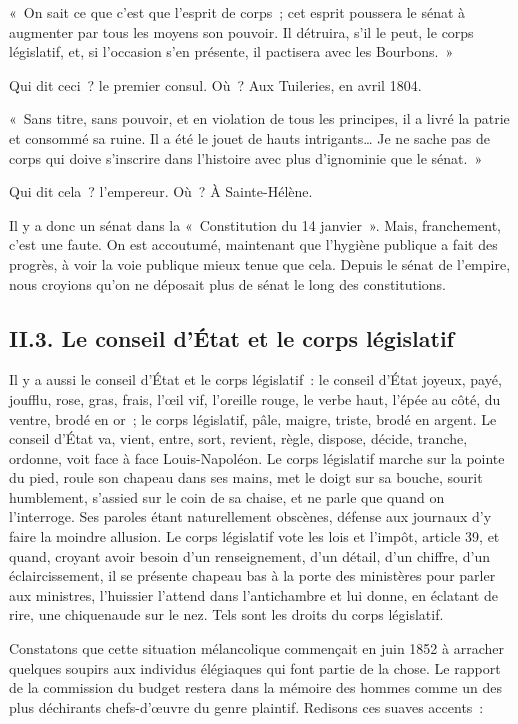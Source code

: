 \documentclass[french,twoside]{book} %
\newenvironment{quoteblock}%
  {\begin{quoting}}
  {\end{quoting}}
\newenvironment{quotebar}{%
    \def\FrameCommand{{\color{rubric!10!}\vrule width 0.5em} \hspace{0.9em}}%
    \def\OuterFrameSep{\itemsep} %
    \MakeFramed {\advance\hsize-\width \FrameRestore}
  }%
  {%
    \endMakeFramed
  }
\renewenvironment{quoteblock}%
  {%
    \savenotes
    \setstretch{0.9}
    \normalfont
    \begin{quotebar}
  }
  {%
    \end{quotebar}
    \spewnotes
  }
\begin{document}
\begin{quoteblock}
 \noindent « On sait ce que c’est que l’esprit de corps ; cet esprit poussera le sénat à augmenter par tous les moyens son pouvoir. Il détruira, s’il le peut, le corps législatif, et, si l’occasion s’en présente, il pactisera avec les Bourbons. »
 \end{quoteblock}

\noindent Qui dit ceci ? le premier consul. Où ? Aux Tuileries, en avril 1804.\par

\begin{quoteblock}
 \noindent « Sans titre, sans pouvoir, et en violation de tous les principes, il a livré la patrie et consommé sa ruine. Il a été le jouet de hauts intrigants… Je ne sache pas de corps qui doive s’inscrire dans l’histoire avec plus d’ignominie que le sénat. »
 \end{quoteblock}

\noindent Qui dit cela ? l’empereur. Où ? À Sainte-Hélène.\par
Il y a donc un sénat dans la « Constitution du 14 janvier ». Mais, franchement, c’est une faute. On est accoutumé, maintenant que l’hygiène publique a fait des progrès, à voir la voie publique mieux tenue que cela. Depuis le sénat de l’empire, nous croyions qu’on ne déposait plus de sénat le long des constitutions.
\subsection[{II.3. Le conseil d’État et le corps législatif}]{II.3. Le conseil d’État et le corps législatif}
\noindent Il y a aussi le conseil d’État et le corps législatif : le conseil d’État joyeux, payé, joufflu, rose, gras, frais, l’œil vif, l’oreille rouge, le verbe haut, l’épée au côté, du ventre, brodé en or ; le corps législatif, pâle, maigre, triste, brodé en argent. Le conseil d’État va, vient, entre, sort, revient, règle, dispose, décide, tranche, ordonne, voit face à face Louis-Napoléon. Le corps législatif marche sur la pointe du pied, roule son chapeau dans ses mains, met le doigt sur sa bouche, sourit humblement, s’assied sur le coin de sa chaise, et ne parle que quand on l’interroge. Ses paroles étant naturellement obscènes, défense aux journaux d’y faire la moindre allusion. Le corps législatif vote les lois et l’impôt, article 39, et quand, croyant avoir besoin d’un renseignement, d’un détail, d’un chiffre, d’un éclaircissement, il se présente chapeau bas à la porte des ministères pour parler aux ministres, l’huissier l’attend dans l’antichambre et lui donne, en éclatant de rire, une chiquenaude sur le nez. Tels sont les droits du corps législatif.\par
Constatons que cette situation mélancolique commençait en juin 1852 à arracher quelques soupirs aux individus élégiaques qui font partie de la chose. Le rapport de la commission du budget restera dans la mémoire des hommes comme un des plus déchirants chefs-d’œuvre du genre plaintif. Redisons ces suaves accents :\par
\end{document}
